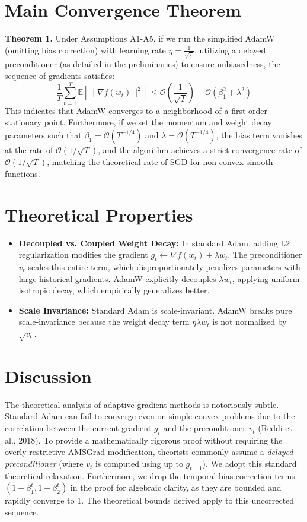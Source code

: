 \documentclass[11pt]{article}
\begin{document}
\section*{Main Convergence Theorem}
\textbf{Theorem 1.} Under Assumptions A1-A5, if we run the simplified AdamW (omitting bias correction) with learning rate $\eta = \frac{1}{\sqrt{T}}$, utilizing a delayed preconditioner (as detailed in the preliminaries) to ensure unbiasedness, the sequence of gradients satisfies:
\begin{equation}
    \frac{1}{T} \sum_{t=1}^T \mathbb{E}[\|\nabla f(w_t)\|^2] \leq \mathcal{O}\left(\frac{1}{\sqrt{T}}\right) + \mathcal{O}(\beta_1^2 + \lambda^2)
\end{equation}
This indicates that AdamW converges to a neighborhood of a first-order stationary point. Furthermore, if we set the momentum and weight decay parameters such that $\beta_1 = \mathcal{O}(T^{-1/4})$ and $\lambda = \mathcal{O}(T^{-1/4})$, the bias term vanishes at the rate of $\mathcal{O}(1/\sqrt{T})$, and the algorithm achieves a strict convergence rate of $\mathcal{O}(1/\sqrt{T})$, matching the theoretical rate of SGD for non-convex smooth functions.

\section*{Theoretical Properties}
\begin{itemize}
    \item \textbf{Decoupled vs. Coupled Weight Decay:} In standard Adam, adding L2 regularization modifies the gradient $g_t \gets \nabla f(w_t) + \lambda w_t$. The preconditioner $v_t$ scales this entire term, which disproportionately penalizes parameters with large historical gradients. AdamW explicitly decouples $\lambda w_t$, applying uniform isotropic decay, which empirically generalizes better.
    \item \textbf{Scale Invariance:} Standard Adam is scale-invariant. AdamW breaks pure scale-invariance because the weight decay term $\eta \lambda w_t$ is not normalized by $\sqrt{v_t}$.
\end{itemize}

\section*{Discussion}
The theoretical analysis of adaptive gradient methods is notoriously subtle. Standard Adam can fail to converge even on simple convex problems due to the correlation between the current gradient $g_t$ and the preconditioner $v_t$ (Reddi et al., 2018). To provide a mathematically rigorous proof without requiring the overly restrictive AMSGrad modification, theorists commonly assume a \emph{delayed preconditioner} (where $v_t$ is computed using up to $g_{t-1}$). We adopt this standard theoretical relaxation. Furthermore, we drop the temporal bias correction terms $(1-\beta_1^t, 1-\beta_2^t)$ in the proof for algebraic clarity, as they are bounded and rapidly converge to 1. The theoretical bounds derived apply to this uncorrected sequence.
\end{document}
